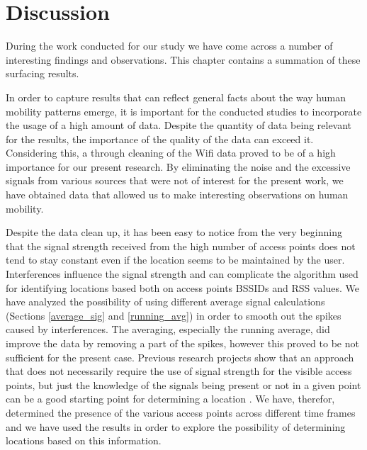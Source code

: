 \chapter{Discussion}

During the work conducted for our study we have come across a number of
interesting findings and observations. This chapter contains a summation of
these surfacing results.

In order to capture results that can reflect general facts about the way human
mobility patterns emerge, it is important for the conducted studies to
incorporate the usage of a high amount of data. Despite the quantity of data
being relevant for the results, the importance of the quality of the data can
exceed it. Considering this, a through cleaning of the Wifi data proved to be of
a high importance for our present research. By eliminating the noise and the
excessive signals from various sources that were not of interest for the
present work, we have obtained data that allowed us to make interesting
observations on human mobility.

Despite the data clean up, it has been easy to notice from the very beginning
that the signal strength received from the high number of access points does not
tend to stay constant even if the location seems to be maintained by the user.
Interferences influence the signal strength \cite{MahantiCWA10} and can
complicate the algorithm used for identifying locations based both on access
points BSSIDs and RSS values. We have analyzed the possibility of using
different average signal calculations (Sections \ref{average_sig} and
\ref{running_avg}) in order to smooth out the spikes caused by interferences.
The averaging, especially the running average, did improve the data by removing
a part of the spikes, however this proved to be not sufficient for the present
case. Previous research projects show that an approach that does not necessarily
require the use of signal strength for the visible access points, but just the
knowledge of the signals being present or not in a given point can be a good
starting point for determining a location
\cite{Larsen:2009:MCT:1813042.1813063}. We have, therefor, determined the
presence of the various access points across different time frames and we have
used the results in order to explore the possibility of determining locations
based on this information.

